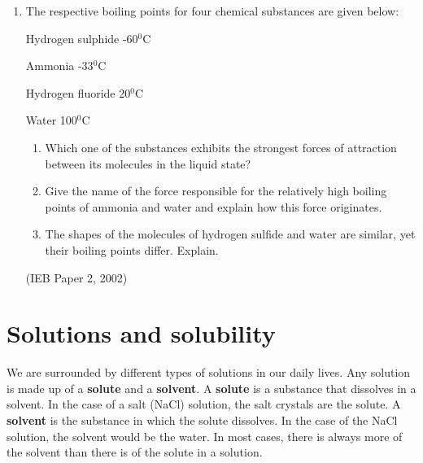 \begin{eocexercises}{}
\begin{enumerate}
\item{The respective boiling points for four chemical substances are given below:

Hydrogen sulphide -60$^{0}$C

Ammonia -33$^{0}$C

Hydrogen fluoride 20$^{0}$C

Water 100$^{0}$C

		\begin{enumerate}
		\item{Which one of the substances exhibits the strongest forces of attraction between its molecules in the liquid state?}
		\item{Give the name of the force responsible for the relatively high boiling points of ammonia and water and explain how this force originates.}
		\item{The shapes of the molecules of hydrogen sulfide and water are similar, yet their boiling points differ. Explain.}
		\end{enumerate} 

}
(IEB Paper 2, 2002)
\end{enumerate}

\practiceinfo
\end{eocexercises}






\chapter{Solutions and solubility}
\label{chap:solutions}

We are surrounded by different types of solutions in our daily lives. Any solution is made up of a \textbf{solute} and a \textbf{solvent}. A \textbf{solute} is a substance that dissolves in a solvent. In the case of a salt (NaCl) solution, the salt crystals are the solute. A \textbf{solvent} is the substance in which the solute dissolves. In the case of the NaCl solution, the solvent would be the water. In most cases, there is always more of the solvent than there is of the solute in a solution.


